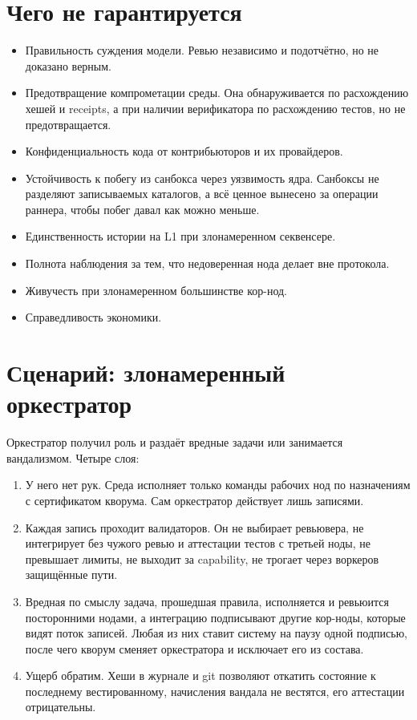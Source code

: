\section{Чего не гарантируется}

\begin{warnbox}
\begin{itemize}
\item Правильность суждения модели. Ревью независимо и подотчётно, но не доказано верным.
\item Предотвращение компрометации среды. Она обнаруживается по расхождению хешей и receipts, а при наличии верификатора по расхождению тестов, но не предотвращается.
\item Конфиденциальность кода от контрибьюторов и их провайдеров.
\item Устойчивость к побегу из санбокса через уязвимость ядра. Санбоксы не разделяют записываемых каталогов, а всё ценное вынесено за операции раннера, чтобы побег давал как можно меньше.
\item Единственность истории на L1 при злонамеренном секвенсере.
\item Полнота наблюдения за тем, что недоверенная нода делает вне протокола.
\item Живучесть при злонамеренном большинстве кор-нод.
\item Справедливость экономики.
\end{itemize}
\end{warnbox}

\section{Сценарий: злонамеренный оркестратор}

Оркестратор получил роль и раздаёт вредные задачи или занимается вандализмом. Четыре слоя:

\begin{enumerate}
\item У него нет рук. Среда исполняет только команды рабочих нод по назначениям с сертификатом кворума. Сам оркестратор действует лишь записями.
\item Каждая запись проходит валидаторов. Он не выбирает ревьювера, не интегрирует без чужого ревью и аттестации тестов с третьей ноды, не превышает лимиты, не выходит за capability, не трогает через воркеров защищённые пути.
\item Вредная по смыслу задача, прошедшая правила, исполняется и ревьюится посторонними нодами, а интеграцию подписывают другие кор-ноды, которые видят поток записей. Любая из них ставит систему на паузу одной подписью, после чего кворум сменяет оркестратора и исключает его из состава.
\item Ущерб обратим. Хеши в журнале и git позволяют откатить состояние к последнему вестированному, начисления вандала не вестятся, его аттестации отрицательны.
\end{enumerate}

